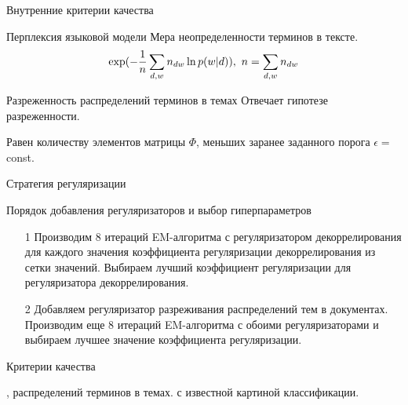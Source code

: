 \documentclass{beamer}
\begin{document}
\begin{frame}{Внутренние критерии качества}
\begin{block}{Перплексия языковой модели}
	Мера неопределенности терминов в тексте.
\begin{align*}
 \exp(-{1\over{n}}\sum\limits_{d,w} {n_{dw}}\ln p(w|d)),~n=\sum\limits_{d,w}{n_{dw}}
\end{align*} 
    \end{block}
\begin{block}{Разреженность распределений терминов в темах}
	Отвечает гипотезе разреженности.
	
Равен количеству элементов матрицы $\Phi$, меньших заранее заданного порога $\epsilon=$ const.
    \end{block}
\end{frame}
\begin{frame}{Стратегия регуляризации}
\begin{block}{Порядок добавления регуляризаторов и выбор гиперпараметров}
    \begin{itemize}
        \item[1] Производим 8 итераций EM-алгоритма с регуляризатором декоррелирования для каждого значения коэффициента регуляризации декоррелирования из сетки значений. Выбираем лучший коэффициент регуляризации для регуляризатора декоррелирования.
        \item[2] Добавляем регуляризатор разреживания распределений тем в документах. Производим еще 8 итераций EM-алгоритма с обоими регуляризаторами и выбираем лучшее значение коэффициента регуляризации.
    \end{itemize} 
    \end{block}
\begin{block}{Критерии качества}
\begin{itemize}
 , 
 распределений терминов в темах.
 с известной картиной классификации.
    \end{itemize} 
\end{block}
\end{frame}
\end{document}
